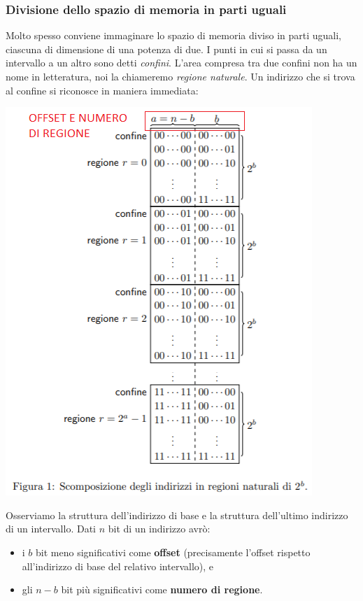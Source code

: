 \documentclass[11pt]{report}
\theoremstyle{definition}
\begin{document}
\subsubsection{Divisione dello spazio di memoria in parti uguali}
Molto spesso conviene immaginare lo spazio di memoria diviso in parti uguali, ciascuna di dimensione di una potenza di due. 
I punti in cui si passa da un intervallo a un altro sono detti \emph{confini}. L'area compresa tra due confini non ha un nome in letteratura, noi la chiameremo \emph{regione naturale}.
Un indirizzo che si trova al confine si riconosce in maniera immediata:
\begin{center}
\includegraphics{img/6.PNG}
\end{center}
Osserviamo la struttura dell'indirizzo di base e la struttura dell'ultimo indirizzo di un intervallo. Dati $n$ bit di un indirizzo avrò:
\begin{itemize}
\item i $b$ bit meno significativi come \textbf{offset} (precisamente l'offset rispetto all'indirizzo di base del relativo intervallo), e
\item gli $n-b$ bit più significativi come \textbf{numero di regione}.
\end{itemize}
\end{document}
